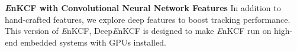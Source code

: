 \documentclass[10pt,twocolumn,letterpaper]{article}
\begin{document}
\textbf{{\it E}nKCF with Convolutional Neural Network Features} In
addition to hand-crafted features, we explore deep features to boost
tracking performance. This version of {\it E}nKCF, Deep{\it E}nKCF is
designed to make {\it E}nKCF run on high-end embedded systems with GPUs
installed.

\end{document}
